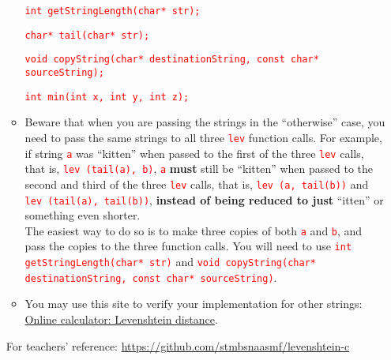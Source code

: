 \documentclass[12pt]{article}
\begin{document}
\begin{enumerate}
\begin{itemize}
            \textcolor{red}{\texttt{int getStringLength(char* str);}}

            \textcolor{red}{\texttt{char* tail(char* str);}}

            \textcolor{red}{\texttt{void copyString(char* destinationString, const char* sourceString);}}
                
            \textcolor{red}{\texttt{int min(int x, int y, int z);}} \\
    
        \item Beware that when you are passing the strings in the ``otherwise'' case, you need to pass the same strings to all three \textcolor{red}{\texttt{lev}} function calls. 
        For example, if string \textcolor{red}{\texttt{a}} was ``kitten'' when passed to the first of the three \textcolor{red}{\texttt{lev}} calls, that is, 
        \textcolor{red}{\texttt{lev (tail(a), b)}}, \textcolor{red}{\texttt{a}} \textbf{must} still be ``kitten'' when passed to the second and third of the three \textcolor{red}{\texttt{lev}} calls, that 
        is, \textcolor{red}{\texttt{lev (a, tail(b))}} and \textcolor{red}{\texttt{lev (tail(a), tail(b))}}, \textbf{instead of being reduced to just} ``itten'' or something even shorter. \\

        The easiest way to do so is to make three copies of both \textcolor{red}{\texttt{a}} and \textcolor{red}{\texttt{b}}, and pass the copies to the three function calls. You will need to use 
        \textcolor{red}{\texttt{int getStringLength(char* str)}} and \textcolor{red}{\texttt{void copyString(char* destinationString, const char* sourceString)}}. \\

        \item You may use this site to verify your implementation for other strings: \href{https://planetcalc.com/1721/}{Online calculator: Levenshtein distance}. 
    
    \end{itemize}

    For teachers' reference: \url{https://github.com/stmbsnaasmf/levenshtein-c}

\end{enumerate}
\end{document}
